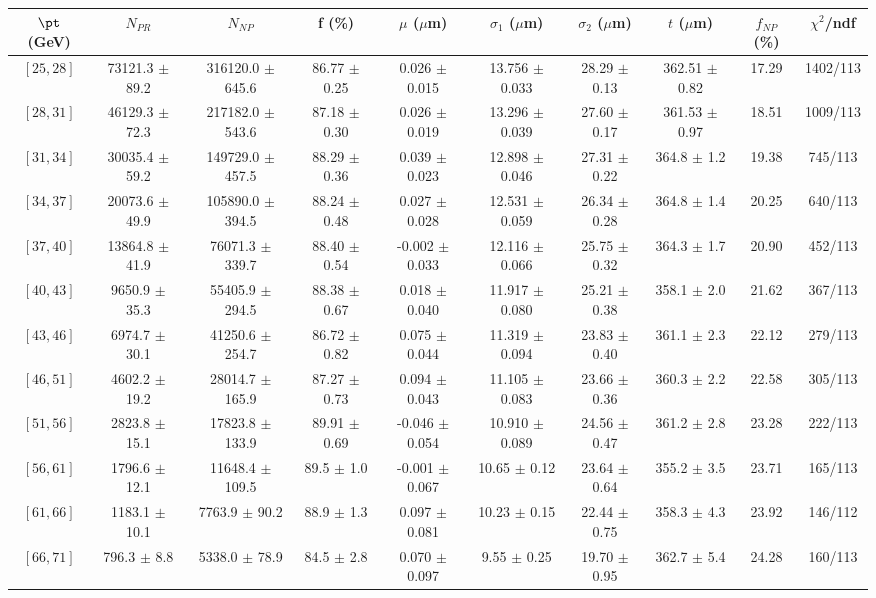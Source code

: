 \begin{tabular}{c||c|c|c|c|c|c|c||c|c}
$\pt$ (GeV) & $N_{PR}$ & $N_{NP}$ & f (\%) & $\mu$ ($\mu$m) & $\sigma_1$ ($\mu$m) & $\sigma_2$ ($\mu$m)  & $t$ ($\mu$m) & $f_{NP}$ (\%) & $\chi^2$/ndf \\
\hline
$[25, 28]$ & 73121.3 $\pm$ 89.2 & 316120.0 $\pm$ 645.6 & 86.77 $\pm$ 0.25 & 0.026 $\pm$ 0.015 & 13.756 $\pm$ 0.033 & 28.29 $\pm$ 0.13 & 362.51 $\pm$ 0.82 & 17.29 & 1402/113\\
$[28, 31]$ & 46129.3 $\pm$ 72.3 & 217182.0 $\pm$ 543.6 & 87.18 $\pm$ 0.30 & 0.026 $\pm$ 0.019 & 13.296 $\pm$ 0.039 & 27.60 $\pm$ 0.17 & 361.53 $\pm$ 0.97 & 18.51 & 1009/113\\
$[31, 34]$ & 30035.4 $\pm$ 59.2 & 149729.0 $\pm$ 457.5 & 88.29 $\pm$ 0.36 & 0.039 $\pm$ 0.023 & 12.898 $\pm$ 0.046 & 27.31 $\pm$ 0.22 & 364.8 $\pm$ 1.2 & 19.38 & 745/113\\
$[34, 37]$ & 20073.6 $\pm$ 49.9 & 105890.0 $\pm$ 394.5 & 88.24 $\pm$ 0.48 & 0.027 $\pm$ 0.028 & 12.531 $\pm$ 0.059 & 26.34 $\pm$ 0.28 & 364.8 $\pm$ 1.4 & 20.25 & 640/113\\
$[37, 40]$ & 13864.8 $\pm$ 41.9 & 76071.3 $\pm$ 339.7 & 88.40 $\pm$ 0.54 & -0.002 $\pm$ 0.033 & 12.116 $\pm$ 0.066 & 25.75 $\pm$ 0.32 & 364.3 $\pm$ 1.7 & 20.90 & 452/113\\
$[40, 43]$ & 9650.9 $\pm$ 35.3 & 55405.9 $\pm$ 294.5 & 88.38 $\pm$ 0.67 & 0.018 $\pm$ 0.040 & 11.917 $\pm$ 0.080 & 25.21 $\pm$ 0.38 & 358.1 $\pm$ 2.0 & 21.62 & 367/113\\
$[43, 46]$ & 6974.7 $\pm$ 30.1 & 41250.6 $\pm$ 254.7 & 86.72 $\pm$ 0.82 & 0.075 $\pm$ 0.044 & 11.319 $\pm$ 0.094 & 23.83 $\pm$ 0.40 & 361.1 $\pm$ 2.3 & 22.12 & 279/113\\
$[46, 51]$ & 4602.2 $\pm$ 19.2 & 28014.7 $\pm$ 165.9 & 87.27 $\pm$ 0.73 & 0.094 $\pm$ 0.043 & 11.105 $\pm$ 0.083 & 23.66 $\pm$ 0.36 & 360.3 $\pm$ 2.2 & 22.58 & 305/113\\
$[51, 56]$ & 2823.8 $\pm$ 15.1 & 17823.8 $\pm$ 133.9 & 89.91 $\pm$ 0.69 & -0.046 $\pm$ 0.054 & 10.910 $\pm$ 0.089 & 24.56 $\pm$ 0.47 & 361.2 $\pm$ 2.8 & 23.28 & 222/113\\
$[56, 61]$ & 1796.6 $\pm$ 12.1 & 11648.4 $\pm$ 109.5 & 89.5 $\pm$ 1.0 & -0.001 $\pm$ 0.067 & 10.65 $\pm$ 0.12 & 23.64 $\pm$ 0.64 & 355.2 $\pm$ 3.5 & 23.71 & 165/113\\
$[61, 66]$ & 1183.1 $\pm$ 10.1 & 7763.9 $\pm$ 90.2 & 88.9 $\pm$ 1.3 & 0.097 $\pm$ 0.081 & 10.23 $\pm$ 0.15 & 22.44 $\pm$ 0.75 & 358.3 $\pm$ 4.3 & 23.92 & 146/112\\
$[66, 71]$ & 796.3 $\pm$ 8.8 & 5338.0 $\pm$ 78.9 & 84.5 $\pm$ 2.8 & 0.070 $\pm$ 0.097 & 9.55 $\pm$ 0.25 & 19.70 $\pm$ 0.95 & 362.7 $\pm$ 5.4 & 24.28 & 160/113\\

\end{tabular}

